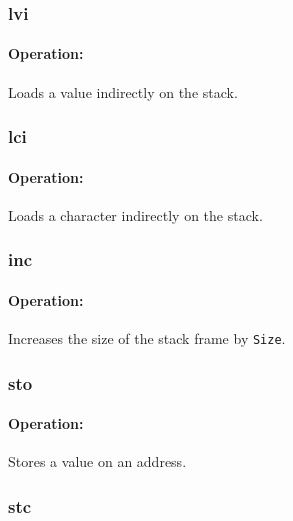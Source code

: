 \subsubsection{lvi}

\paragraph{Operation:}
Loads a value indirectly on the stack.

\subsubsection{lci}

\paragraph{Operation:}
Loads a character indirectly on the stack.

\subsubsection{inc}

\paragraph{Operation:}
Increases the size of the stack frame by \lstinline$Size$.

\subsubsection{sto}

\paragraph{Operation:}
Stores a value on an address.

\subsubsection{stc}

